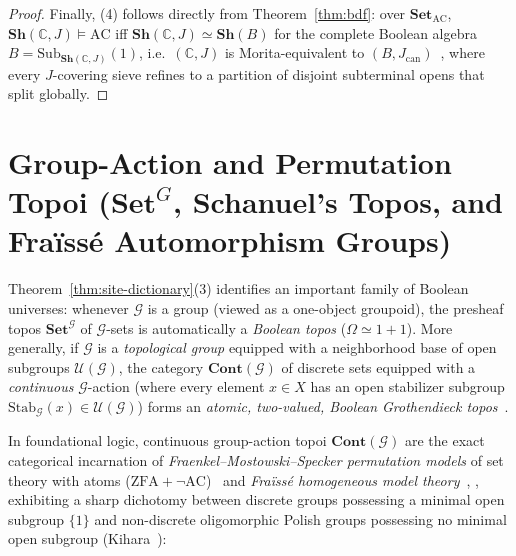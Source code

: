 \begin{proof}
Finally, (4) follows directly from Theorem~\ref{thm:bdf}: over $\mathbf{Set}_{\mathrm{AC}}$, $\mathbf{Sh}(\mathbb{C}, J) \models \mathrm{AC}$ iff $\mathbf{Sh}(\mathbb{C}, J) \simeq \mathbf{Sh}(B)$ for the complete Boolean algebra $B = \mathrm{Sub}_{\mathbf{Sh}(\mathbb{C}, J)}(1)$, i.e.\ $(\mathbb{C}, J)$ is Morita-equivalent to $(B, J_{\mathrm{can}})$~\cite{Caramello18}, where every $J$-covering sieve refines to a partition of disjoint subterminal opens that split globally.
\end{proof}

\section{Group-Action and Permutation Topoi ($\mathbf{Set}^G$, Schanuel's Topos, and Fraïssé Automorphism Groups)}\label{sec:permutation-topoi}

Theorem~\ref{thm:site-dictionary}(3) identifies an important family of Boolean universes: whenever $\mathcal{G}$ is a group (viewed as a one-object groupoid), the presheaf topos $\mathbf{Set}^{\mathcal{G}}$ of $\mathcal{G}$-sets is automatically a \emph{Boolean topos} ($\Omega \simeq 1+1$). More generally, if $\mathcal{G}$ is a \emph{topological group} equipped with a neighborhood base of open subgroups $\mathcal{U}(\mathcal{G})$, the category $\mathbf{Cont}(\mathcal{G})$ of discrete sets equipped with a \emph{continuous} $\mathcal{G}$-action (where every element $x \in X$ has an open stabilizer subgroup $\mathrm{Stab}_{\mathcal{G}}(x) \in \mathcal{U}(\mathcal{G})$) forms an \emph{atomic, two-valued, Boolean Grothendieck topos}~\cite[Ch.~III, \S 9]{MacLaneMoerdijk92}.

In foundational logic, continuous group-action topoi $\mathbf{Cont}(\mathcal{G})$ are the exact categorical incarnation of \emph{Fraenkel--Mostowski--Specker permutation models} of set theory with atoms ($\mathrm{ZFA} + \neg\mathrm{AC}$)~\cite[Ch.~4]{Jech73} and \emph{Fraïssé homogeneous model theory}~\cite{Fraisse54}, \cite[\S 7.1]{Hodges93}, exhibiting a sharp dichotomy between discrete groups possessing a minimal open subgroup $\{1\}$ and non-discrete oligomorphic Polish groups possessing no minimal open subgroup (Kihara~\cite[Theorems~6.2 and~6.19]{Kihara26}):

